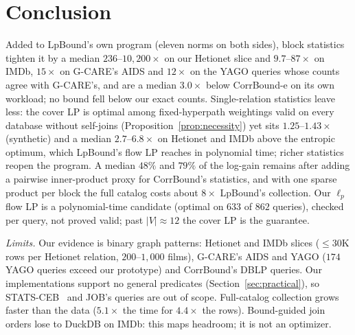 \documentclass[conference]{IEEEtran}
\begin{document}
\section{Conclusion}
\label{sec:conclusion}

Added to LpBound's own program (eleven norms on both sides), block
statistics tighten it by a median $236$--$10{,}200\times$ on our Hetionet
slice and $9.7$--$87\times$ on IMDb, $15\times$ on G-CARE's AIDS and
$12\times$ on the YAGO queries whose counts agree with G-CARE's, and are
a median $3.0\times$ below CorrBound-e on its own workload; no
bound fell below our exact counts. Single-relation statistics
leave less: the cover LP is optimal among fixed-hyperpath weightings valid
on every database without self-joins (Proposition~\ref{prop:necessity})
yet sits $1.25$--$1.43\times$ (synthetic) and a median
$2.7$--$6.8\times$ on Hetionet and IMDb above the
entropic optimum, which LpBound's flow LP reaches in polynomial time; richer statistics
reopen the program. A median $48\%$ and $79\%$ of the log-gain remains after adding a pairwise
inner-product proxy for CorrBound's statistics, and with one sparse
product per block the full catalog costs about $8\times$ LpBound's
collection. Our $\ell_p$ flow LP is a polynomial-time candidate (optimal on $633$ of $862$ queries), checked per query, not proved valid; past $|V|{\approx}12$ the cover LP is the guarantee.

\emph{Limits.} Our evidence is binary graph patterns: Hetionet and IMDb
slices (${\le}30$K rows per Hetionet relation, $200$--$1{,}000$ films), G-CARE's AIDS and YAGO
($174$ YAGO queries exceed our prototype) and
CorrBound's DBLP queries. Our implementations support no general predicates (Section~\ref{sec:practical}), so
STATS-CEB~\cite{han2021stats} and JOB's queries are out of scope.
Full-catalog collection grows faster than the data ($5.1\times$ the time for $4.4\times$ the rows). Bound-guided join orders lose to DuckDB on IMDb: this maps headroom; it is not an optimizer.

\end{document}
